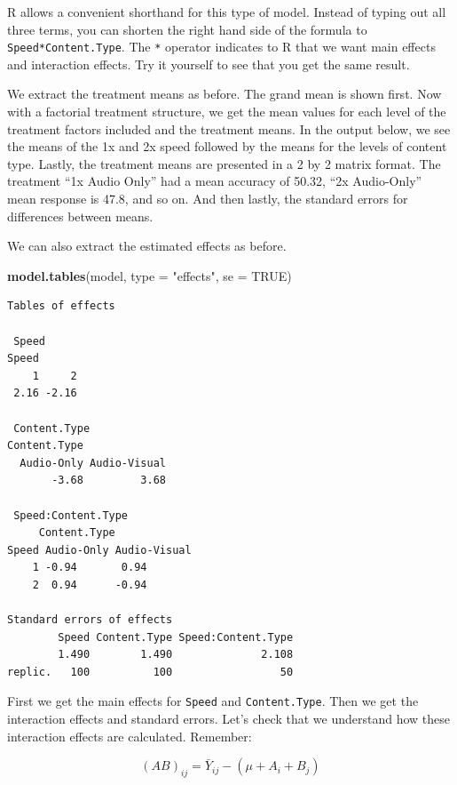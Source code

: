 \documentclass[
  letterpaper,
]{book}
\newenvironment{Shaded}{\begin{snugshade}}{\end{snugshade}}
\newcommand{\AttributeTok}[1]{\textcolor[rgb]{0.13,0.29,0.53}{#1}}
\newcommand{\ConstantTok}[1]{\textcolor[rgb]{0.56,0.35,0.01}{#1}}
\newcommand{\FunctionTok}[1]{\textcolor[rgb]{0.13,0.29,0.53}{\textbf{#1}}}
\newcommand{\NormalTok}[1]{#1}
\newcommand{\StringTok}[1]{\textcolor[rgb]{0.31,0.60,0.02}{#1}}
\begin{document}
R allows a convenient shorthand for this type of model. Instead of
typing out all three terms, you can shorten the right hand side of the
formula to \texttt{Speed*Content.Type}. The \texttt{*} operator
indicates to R that we want main effects and interaction effects. Try it
yourself to see that you get the same result.

We extract the treatment means as before. The grand mean is shown first.
Now with a factorial treatment structure, we get the mean values for
each level of the treatment factors included and the treatment means. In
the output below, we see the means of the 1x and 2x speed followed by
the means for the levels of content type. Lastly, the treatment means
are presented in a 2 by 2 matrix format. The treatment ``1x Audio Only''
had a mean accuracy of 50.32, ``2x Audio-Only'' mean response is 47.8,
and so on. And then lastly, the standard errors for differences between
means.

We can also extract the estimated effects as before.

\begin{Shaded}
\begin{Highlighting}[]
\FunctionTok{model.tables}\NormalTok{(model, }\AttributeTok{type =} \StringTok{"effects"}\NormalTok{, }\AttributeTok{se =} \ConstantTok{TRUE}\NormalTok{)}
\end{Highlighting}
\end{Shaded}

\begin{verbatim}
Tables of effects

 Speed 
Speed
    1     2 
 2.16 -2.16 

 Content.Type 
Content.Type
  Audio-Only Audio-Visual 
       -3.68         3.68 

 Speed:Content.Type 
     Content.Type
Speed Audio-Only Audio-Visual
    1 -0.94       0.94       
    2  0.94      -0.94       

Standard errors of effects
        Speed Content.Type Speed:Content.Type
        1.490        1.490              2.108
replic.   100          100                 50
\end{verbatim}

First we get the main effects for \texttt{Speed} and
\texttt{Content.Type}. Then we get the interaction effects and standard
errors. Let's check that we understand how these interaction effects are
calculated. Remember:

\[(AB)_{ij} = \bar{Y}_{ij} - (\mu + A_i + B_j) \]
\end{document}
